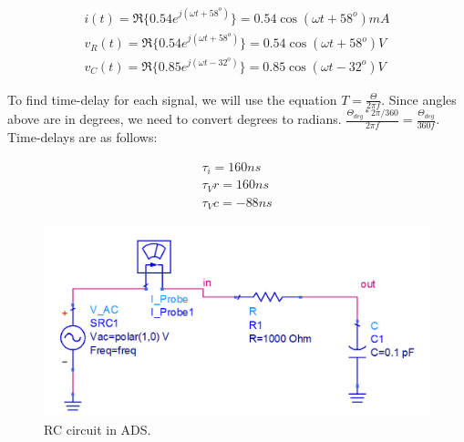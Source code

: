 \documentclass{ximera}
\begin{document}
\begin{example}
\begin{explanation}
\begin{enumerate}
\begin{eqnarray}
i(t)= \Re \{  0.54 e^{j(\omega t + 58^o)}  \} =0.54 \cos(\omega t + 58^o)  \unit{mA}  \\
v_R(t)= \Re \{ 0.54  e^{j( \omega t + 58^o)} \} = 0.54 \cos(\omega t + 58^o) \unit{V}   \\ 
v_C(t) =\Re \{ 0.85 e^{j(\omega t - 32^o)}    \} = 0.85 \cos(\omega t - 32^o) \unit{V}
\end{eqnarray}
\end{enumerate}
 
 To find time-delay for each signal, we will use the equation $T=\frac{\Theta}{2 \pi f}$.  Since angles above are in degrees, we need to convert degrees to radians. $\frac{\Theta_{deg}*2 \pi /360}{2 \pi f}=\frac{ \Theta_{deg}}{360 f}  $. Time-delays are as follows:
 
 \begin{eqnarray}
 \tau_i= 160 \unit{ns} \\
 \tau_Vr= 160 \unit{ns} \\
 \tau_Vc=- 88 \unit{ns}  
 \end{eqnarray}
 
 
 


\begin{figure}[htbp]
\begin{center}
\includegraphics[scale=0.2]{../jpg/RCcircADS.jpg}
\end{center}
\caption{\label{RCcircADS} RC circuit in ADS.}
\end{figure}



\end{explanation}
\end{example}
\end{document}
